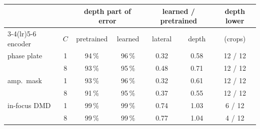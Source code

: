 \begin{tabular}{@{}l c cc cc c@{}}\toprule
 & & \multicolumn{2}{c}{depth part of error} & \multicolumn{2}{c}{learned / pretrained} & depth lower\\
\cmidrule(lr){3-4}\cmidrule(lr){5-6}
encoder & $C$ & pretrained & learned & lateral & depth & (crops)\\\midrule
phase plate & 1 & 94\,\% & 96\,\% & 0.32 & 0.58 & 12 / 12\\
 & 8 & 93\,\% & 95\,\% & 0.48 & 0.71 & 12 / 12\\
amp.\ mask & 1 & 93\,\% & 96\,\% & 0.32 & 0.61 & 12 / 12\\
 & 8 & 91\,\% & 95\,\% & 0.37 & 0.55 & 12 / 12\\
in-focus DMD & 1 & 99\,\% & 99\,\% & 0.74 & 1.03 & 6 / 12\\
 & 8 & 99\,\% & 99\,\% & 0.77 & 1.04 & 4 / 12\\
\bottomrule\end{tabular}
